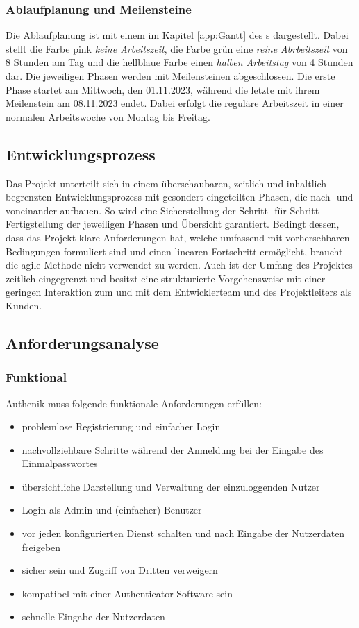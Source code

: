 \subsubsection{Ablaufplanung und Meilensteine}
\label{sec:Ablaufplaung und Meilensteine}
Die Ablaufplanung ist mit einem  im Kapitel \ref{app:Gantt} des s dargestellt. 
Dabei stellt die Farbe pink \textit{keine Arbeitszeit}, die Farbe grün eine \textit{reine Abrbeitszeit} 
von 8 Stunden am Tag und die hellblaue Farbe einen \textit{halben Arbeitstag} von 4 Stunden dar. Die jeweiligen Phasen 
werden mit Meilensteinen abgeschlossen. Die erste Phase startet am Mittwoch, den 01.11.2023, während die letzte 
mit ihrem Meilenstein am 08.11.2023 endet. Dabei erfolgt die reguläre Arbeitszeit in einer normalen Arbeitswoche 
von Montag bis Freitag.

\subsection{Entwicklungsprozess}
\label{sec:Entwicklungsprozess}
Das Projekt unterteilt sich in einem überschaubaren, zeitlich und inhaltlich begrenzten Entwicklungsprozess 
mit gesondert eingeteilten Phasen, die nach- und voneinander aufbauen. So wird eine Sicherstellung der Schritt- 
für Schritt-Fertigstellung der jeweiligen Phasen und Übersicht garantiert. Bedingt dessen, dass das Projekt klare Anforderungen 
hat, welche umfassend mit vorhersehbaren Bedingungen formuliert sind und einen linearen Fortschritt ermöglicht, braucht 
die agile Methode nicht verwendet zu werden. Auch ist der Umfang des Projektes zeitlich eingegrenzt und besitzt eine 
strukturierte Vorgehensweise mit einer geringen Interaktion zum und mit dem Entwicklerteam und des Projektleiters als Kunden.

\subsection{Anforderungsanalyse}
\label{sec:Anforderungsanalyse}

\subsubsection{Funktional}
\label{sec:Funktional}
Authenik muss folgende funktionale Anforderungen erfüllen:
\begin{itemize} [label=--]
	\item problemlose Registrierung und einfacher Login
	\item nachvollziehbare Schritte während der Anmeldung bei der Eingabe des Einmalpasswortes
	\item übersichtliche Darstellung und Verwaltung der einzuloggenden Nutzer
	\item Login als Admin und (einfacher) Benutzer
	\item vor jeden konfigurierten Dienst schalten und nach Eingabe der Nutzerdaten freigeben
	\item sicher sein und Zugriff von Dritten verweigern
	\item kompatibel mit einer Authenticator-Software sein
	\item schnelle Eingabe der Nutzerdaten
\end{itemize}

